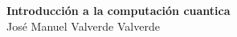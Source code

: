 \documentclass[12pt]{article}
\begin{document}
\onehalfspacing

\begin{titlepage}
    \centering
    \vspace*{5cm} %
    {\LARGE \textbf{Introducción a la computación cuantica}}\\[1cm]
    {José Manuel Valverde Valverde} %
    \vfill
\end{titlepage}



\end{document}
